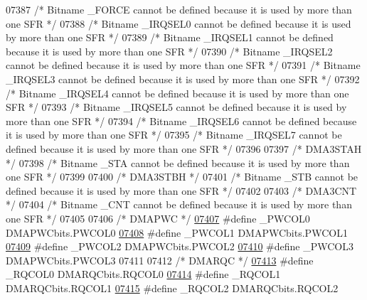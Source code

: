 \begin{DoxyCode}
07387 \textcolor{comment}{/* Bitname \_FORCE cannot be defined because it is used by more than one SFR */}
07388 \textcolor{comment}{/* Bitname \_IRQSEL0 cannot be defined because it is used by more than one SFR */}
07389 \textcolor{comment}{/* Bitname \_IRQSEL1 cannot be defined because it is used by more than one SFR */}
07390 \textcolor{comment}{/* Bitname \_IRQSEL2 cannot be defined because it is used by more than one SFR */}
07391 \textcolor{comment}{/* Bitname \_IRQSEL3 cannot be defined because it is used by more than one SFR */}
07392 \textcolor{comment}{/* Bitname \_IRQSEL4 cannot be defined because it is used by more than one SFR */}
07393 \textcolor{comment}{/* Bitname \_IRQSEL5 cannot be defined because it is used by more than one SFR */}
07394 \textcolor{comment}{/* Bitname \_IRQSEL6 cannot be defined because it is used by more than one SFR */}
07395 \textcolor{comment}{/* Bitname \_IRQSEL7 cannot be defined because it is used by more than one SFR */}
07396 
07397 \textcolor{comment}{/* DMA3STAH */}
07398 \textcolor{comment}{/* Bitname \_STA cannot be defined because it is used by more than one SFR */}
07399 
07400 \textcolor{comment}{/* DMA3STBH */}
07401 \textcolor{comment}{/* Bitname \_STB cannot be defined because it is used by more than one SFR */}
07402 
07403 \textcolor{comment}{/* DMA3CNT */}
07404 \textcolor{comment}{/* Bitname \_CNT cannot be defined because it is used by more than one SFR */}
07405 
07406 \textcolor{comment}{/* DMAPWC */}
\hypertarget{a00015_source_l07407}{}\hyperlink{a00015_a78261a8bcc86c9723267d2f11a46bbb8}{07407} \textcolor{preprocessor}{#define \_PWCOL0 DMAPWCbits.PWCOL0}
\hypertarget{a00015_source_l07408}{}\hyperlink{a00015_a47a179691d6d01f84dfd7ef4feff5ffe}{07408} \textcolor{preprocessor}{#define \_PWCOL1 DMAPWCbits.PWCOL1}
\hypertarget{a00015_source_l07409}{}\hyperlink{a00015_ab8c9480f601d9ff8b94b0d6a57f72ea6}{07409} \textcolor{preprocessor}{#define \_PWCOL2 DMAPWCbits.PWCOL2}
\hypertarget{a00015_source_l07410}{}\hyperlink{a00015_a2f96e2e030244acf7b0a3243d23bf3f2}{07410} \textcolor{preprocessor}{#define \_PWCOL3 DMAPWCbits.PWCOL3}
07411 
07412 \textcolor{comment}{/* DMARQC */}
\hypertarget{a00015_source_l07413}{}\hyperlink{a00015_a43c50cbc6095bc73e88250f9ee123e6d}{07413} \textcolor{preprocessor}{#define \_RQCOL0 DMARQCbits.RQCOL0}
\hypertarget{a00015_source_l07414}{}\hyperlink{a00015_ac9b999e7b46b4241fccb7947a561ef9f}{07414} \textcolor{preprocessor}{#define \_RQCOL1 DMARQCbits.RQCOL1}
\hypertarget{a00015_source_l07415}{}\hyperlink{a00015_a90b59f07fdbb32f69deac93ba3d29c35}{07415} \textcolor{preprocessor}{#define \_RQCOL2 DMARQCbits.RQCOL2}

\end{DoxyCode}
